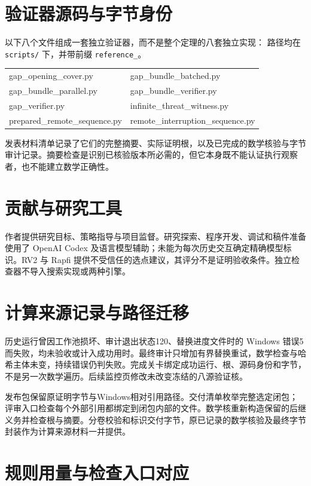 \documentclass[11pt]{article}
\theoremstyle{definition}
\theoremstyle{remark}
\newcommand{\code}[1]{\texttt{#1}}
\begin{document}
\section{验证器源码与字节身份}
\label{app:sources}
以下八个文件组成一套独立验证器，而不是整个定理的八套独立实现：
路径均在 \code{scripts/} 下，并带前缀 \code{reference\_}。
\begin{center}\small\ttfamily
\begin{tabular}{@{}ll@{}}
gap\_opening\_cover.py & gap\_bundle\_batched.py\\
gap\_bundle\_parallel.py & gap\_bundle\_verifier.py\\
gap\_verifier.py & infinite\_threat\_witness.py\\
prepared\_remote\_sequence.py & remote\_interruption\_sequence.py
\end{tabular}\end{center}
发表材料清单记录了它们的完整摘要、实际证明根，以及已完成的数学核验与字节审计记录。摘要检查是识别已核验版本所必需的，但它本身既不能认证执行观察者，也不能建立数学正确性。


\section{贡献与研究工具}
作者提供研究目标、策略指导与项目监督。研究探索、程序开发、调试和稿件准备使用了 OpenAI Codex 及语言模型辅助；未能为每次历史交互确定精确模型标识。RV2 与 Rapfi 提供不受信任的选点建议，其评分不是证明验收条件。独立检查器不导入搜索实现或两种引擎。


\section{计算来源记录与路径迁移}
\label{app:provenance}
历史运行曾因工作池损坏、审计退出状态120、替换进度文件时的 Windows 错误5而失败，均未验收或计入成功用时。最终审计只增加有界替换重试，数学检查与哈希主体未变，持续错误仍判失败。完成关卡绑定成功运行、根、源码身份和字节，不是另一次数学遍历。后续监控页修改未改变冻结的八源验证核。

发布包保留原证明字节与Windows相对引用路径。交付清单枚举完整选定闭包；评审入口检查每个外部引用都绑定到闭包内部的文件。数学核重新构造保留的后继义务并检查根与摘要。分卷校验和标识交付字节，原已记录的数学核验及最终字节封装作为计算来源材料一并提供。


\section{规则用量与检查入口对应}
\label{app:rule-use}
\end{document}
